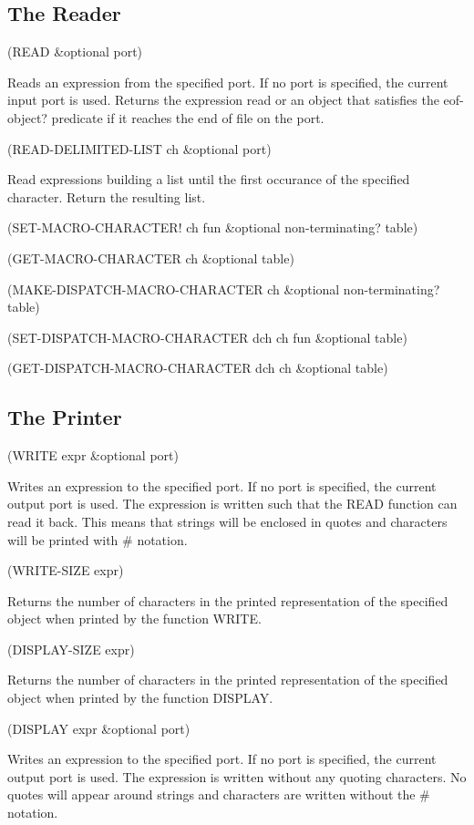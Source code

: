 \documentclass[11pt]{article}
\begin{document}
\subsection{The Reader}
\label{sec-1-34}

(READ \&optional port)

Reads an expression from the specified port. If no port is specified,
the current input port is used. Returns the expression read or an object
that satisfies the eof-object? predicate if it reaches the end of file
on the port.

(READ-DELIMITED-LIST ch \&optional port)

Read expressions building a list until the first occurance of the
specified character.  Return the resulting list.

(SET-MACRO-CHARACTER! ch fun \&optional non-terminating? table)

(GET-MACRO-CHARACTER ch \&optional table)

(MAKE-DISPATCH-MACRO-CHARACTER ch \&optional non-terminating? table)

(SET-DISPATCH-MACRO-CHARACTER dch ch fun \&optional table)

(GET-DISPATCH-MACRO-CHARACTER dch ch \&optional table)
\subsection{The Printer}
\label{sec-1-35}

(WRITE expr \&optional port)

Writes an expression to the specified port. If no port is specified, the
current output port is used. The expression is written such that the
READ function can read it back. This means that strings will be enclosed
in quotes and characters will be printed with \# notation.

(WRITE-SIZE expr)

Returns the number of characters in the printed representation of the
specified object when printed by the function WRITE.

(DISPLAY-SIZE expr)

Returns the number of characters in the printed representation of the
specified object when printed by the function DISPLAY.

(DISPLAY expr \&optional port)

Writes an expression to the specified port. If no port is specified, the
current output port is used. The expression is written without any
quoting characters. No quotes will appear around strings and characters
are written without the \# notation.
\end{document}
